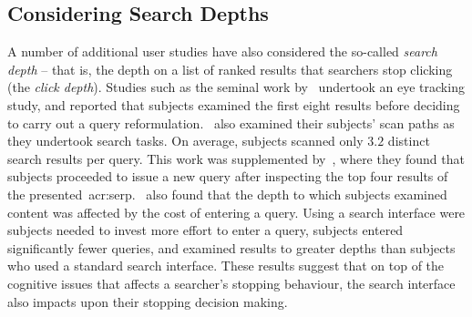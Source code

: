 \subsection{Considering Search Depths}
A number of additional user studies have also considered the so-called \emph{search depth} -- that is, the depth on a list of ranked results that searchers stop clicking (the \emph{click depth}). Studies such as the seminal work by~\cite{cutrell2007eye_tracking} undertook an eye tracking study, and reported that subjects examined the first eight results before deciding to carry out a query reformulation.~\cite{lorigo2008eye_tracking} also examined their subjects' scan paths as they undertook search tasks. On average, subjects scanned only $3.2$ distinct search results per query. This work was supplemented by~\cite{huang2011no_clicks}, where they found that subjects proceeded to issue a new query after inspecting the top four results of the presented~\gls{acr:serp}.~\cite{azzopardi2013query_cost} also found that the depth to which subjects examined content was affected by the cost of entering a query. Using a search interface were subjects needed to invest more effort to enter a query, subjects entered significantly fewer queries, and examined results to greater depths than subjects who used a standard search interface. These results suggest that on top of the cognitive issues that affects a searcher's stopping behaviour, the search interface also impacts upon their stopping decision making.

%
%
%
%
%
%
%
%
%
%
%
%
%
%
%

